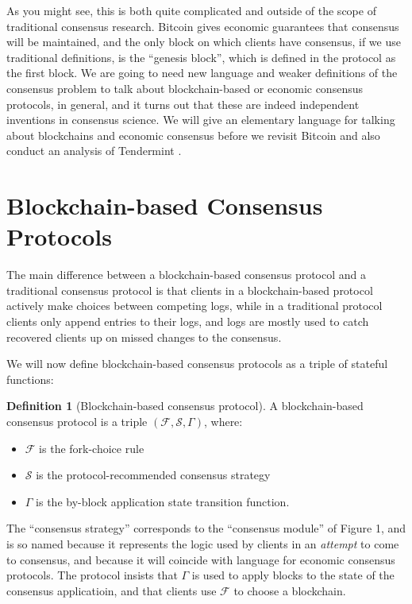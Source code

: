 \documentclass[11pt,a4paper]{article}
\theoremstyle{plain}
\theoremstyle{definition}
\newtheorem{defn}{Definition}
\begin{document}
As you might see, this is both quite complicated and outside of the scope of traditional consensus research. Bitcoin gives economic guarantees that consensus will be maintained, and the only block on which clients have consensus, if we use traditional definitions, is the ``genesis block'', which is defined in the protocol as the first block. We are going to need new language and weaker definitions of the consensus problem to talk about blockchain-based or economic consensus protocols, in general, and it turns out that these are indeed independent inventions in consensus science. We will give an elementary language for talking about blockchains and economic consensus before we revisit Bitcoin and also conduct an analysis of Tendermint \cite{Tendermint}.

\section{Blockchain-based Consensus Protocols}

The main difference between a blockchain-based consensus protocol and a traditional consensus protocol is that clients in a blockchain-based protocol actively make choices between competing logs, while in a traditional protocol clients only append entries to their logs, and logs are mostly used to catch recovered clients up on missed changes to the consensus. 

We will now define blockchain-based consensus protocols as a triple of stateful functions:

\begin{defn}[Blockchain-based consensus protocol]
A blockchain-based consensus protocol is a triple $(\mathcal{F}, \mathcal{S}, \Gamma)$, where:
\begin{itemize}
\item $\mathcal{F}$ is the fork-choice rule
\item $\mathcal{S}$ is the protocol-recommended consensus strategy
\item $\Gamma$ is the by-block application state transition function.
\end{itemize}
\end{defn}

The ``consensus strategy'' corresponds to the ``consensus module'' of Figure 1, and is so named because it represents the logic used by clients in an \emph{attempt} to come to consensus, and because it will coincide with language for economic consensus protocols. The protocol insists that $\Gamma$ is used to apply blocks to the state of the consensus applicatioin, and that clients use $\mathcal{F}$ to choose a blockchain. 
\end{document}
